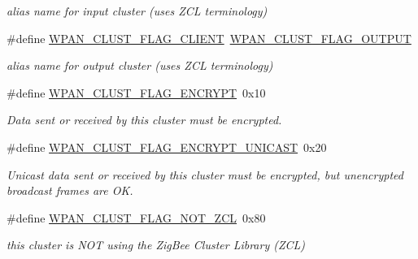 \begin{DoxyCompactItemize}
\begin{DoxyCompactList}\small\item\em alias name for input cluster (uses Z\-C\-L terminology) \end{DoxyCompactList}\item 
\hypertarget{group__wpan__aps_ga9aae0646b212af63cbb07c98a33cd986}{\#define \hyperlink{group__wpan__aps_ga9aae0646b212af63cbb07c98a33cd986}{W\-P\-A\-N\-\_\-\-C\-L\-U\-S\-T\-\_\-\-F\-L\-A\-G\-\_\-\-C\-L\-I\-E\-N\-T}~\hyperlink{group__wpan__aps_ga0456c33bdaa673f37f9285a3f5ca0172}{W\-P\-A\-N\-\_\-\-C\-L\-U\-S\-T\-\_\-\-F\-L\-A\-G\-\_\-\-O\-U\-T\-P\-U\-T}}\label{group__wpan__aps_ga9aae0646b212af63cbb07c98a33cd986}

\begin{DoxyCompactList}\small\item\em alias name for output cluster (uses Z\-C\-L terminology) \end{DoxyCompactList}\item 
\#define \hyperlink{group__wpan__aps_ga1eafd87038a2134da7a1f72e6801d23b}{W\-P\-A\-N\-\_\-\-C\-L\-U\-S\-T\-\_\-\-F\-L\-A\-G\-\_\-\-E\-N\-C\-R\-Y\-P\-T}~0x10
\begin{DoxyCompactList}\small\item\em Data sent or received by this cluster must be encrypted. \end{DoxyCompactList}\item 
\#define \hyperlink{group__wpan__aps_ga1ccfd85378afaa02de5c3f9c71c17df4}{W\-P\-A\-N\-\_\-\-C\-L\-U\-S\-T\-\_\-\-F\-L\-A\-G\-\_\-\-E\-N\-C\-R\-Y\-P\-T\-\_\-\-U\-N\-I\-C\-A\-S\-T}~0x20
\begin{DoxyCompactList}\small\item\em Unicast data sent or received by this cluster must be encrypted, but unencrypted broadcast frames are O\-K. \end{DoxyCompactList}\item 
\hypertarget{group__wpan__aps_gacb0e365a8c5e72ee90be503513e7e630}{\#define \hyperlink{group__wpan__aps_gacb0e365a8c5e72ee90be503513e7e630}{W\-P\-A\-N\-\_\-\-C\-L\-U\-S\-T\-\_\-\-F\-L\-A\-G\-\_\-\-N\-O\-T\-\_\-\-Z\-C\-L}~0x80}\label{group__wpan__aps_gacb0e365a8c5e72ee90be503513e7e630}

\begin{DoxyCompactList}\small\item\em this cluster is N\-O\-T using the Zig\-Bee Cluster Library (Z\-C\-L) \end{DoxyCompactList}\end{DoxyCompactItemize}


